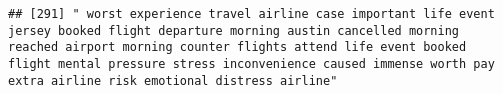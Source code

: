 \documentclass[
]{article}
\begin{document}
\begin{verbatim}
## [291] " worst experience travel airline case important life event jersey booked flight departure morning austin cancelled morning reached airport morning counter flights attend life event booked flight mental pressure stress inconvenience caused immense worth pay extra airline risk emotional distress airline"                                                                                                                                                                                                                                                                                                                                                                                                                                                                                                                                                                                                                                                                                                                                                                                                                                                                                                                                                                                                                                                                                                                                                                                                                                                                                                                                                                                                                                                                                

\end{verbatim}
\end{document}

